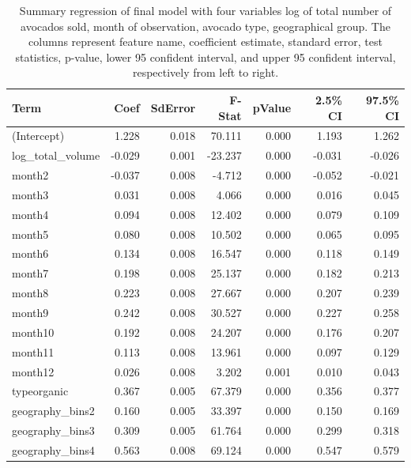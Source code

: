 \documentclass[11pt]{article}\usepackage[]{graphicx}\usepackage[]{color}
\begin{document}
\begin{center}
\begin{table}[ht]
\centering
\begin{tabular}{lrrrrrr}
  \hline
Term & Coef & SdError & F-Stat & pValue & 2.5\% CI & 97.5\% CI \\ 
  \hline
(Intercept) & 1.228 & 0.018 & 70.111 & 0.000 & 1.193 & 1.262 \\ 
  log\_total\_volume & -0.029 & 0.001 & -23.237 & 0.000 & -0.031 & -0.026 \\ 
  month2 & -0.037 & 0.008 & -4.712 & 0.000 & -0.052 & -0.021 \\ 
  month3 & 0.031 & 0.008 & 4.066 & 0.000 & 0.016 & 0.045 \\ 
  month4 & 0.094 & 0.008 & 12.402 & 0.000 & 0.079 & 0.109 \\ 
  month5 & 0.080 & 0.008 & 10.502 & 0.000 & 0.065 & 0.095 \\ 
  month6 & 0.134 & 0.008 & 16.547 & 0.000 & 0.118 & 0.149 \\ 
  month7 & 0.198 & 0.008 & 25.137 & 0.000 & 0.182 & 0.213 \\ 
  month8 & 0.223 & 0.008 & 27.667 & 0.000 & 0.207 & 0.239 \\ 
  month9 & 0.242 & 0.008 & 30.527 & 0.000 & 0.227 & 0.258 \\ 
  month10 & 0.192 & 0.008 & 24.207 & 0.000 & 0.176 & 0.207 \\ 
  month11 & 0.113 & 0.008 & 13.961 & 0.000 & 0.097 & 0.129 \\ 
  month12 & 0.026 & 0.008 & 3.202 & 0.001 & 0.010 & 0.043 \\ 
  typeorganic & 0.367 & 0.005 & 67.379 & 0.000 & 0.356 & 0.377 \\ 
  geography\_bins2 & 0.160 & 0.005 & 33.397 & 0.000 & 0.150 & 0.169 \\ 
  geography\_bins3 & 0.309 & 0.005 & 61.764 & 0.000 & 0.299 & 0.318 \\ 
  geography\_bins4 & 0.563 & 0.008 & 69.124 & 0.000 & 0.547 & 0.579 \\ 
   \hline
\end{tabular}
\caption{Summary regression of final model with four variables log of total number of avocados sold, month of observation, avocado type, geographical group. The columns represent feature name, coefficient estimate, standard error, test statistics, p-value, lower 95 confident interval, and upper 95 confident interval, respectively from left to right.} 
\label{final_fit}
\end{table}

\end{center}
\end{document}
